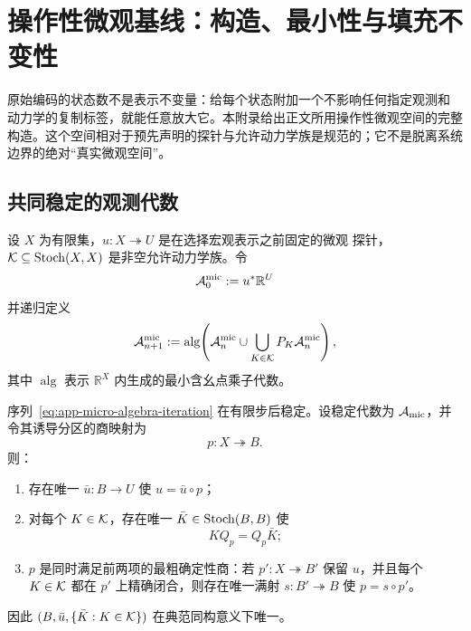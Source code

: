\section{操作性微观基线：构造、最小性与填充不变性}
\label{app:operational-baseline}

原始编码的状态数不是表示不变量：给每个状态附加一个不影响任何指定观测和
动力学的复制标签，就能任意放大它。本附录给出正文所用操作性微观空间的完整
构造。这个空间相对于预先声明的探针与允许动力学族是规范的；它不是脱离系统
边界的绝对``真实微观空间''。

\subsection{共同稳定的观测代数}

设 $X$ 为有限集，$u:X\twoheadrightarrow U$ 是在选择宏观表示之前固定的微观
探针，$\mathcal K\subseteq\operatorname{Stoch}(X,X)$ 是非空允许动力学族。令
\[
  \mathcal A^{\mathrm{mic}}_0:=u^*\mathbb R^U
\]
并递归定义
\begin{equation}
  \mathcal A^{\mathrm{mic}}_{n+1}
  :=\operatorname{alg}\!\left(
      \mathcal A^{\mathrm{mic}}_n
      \cup\bigcup_{K\in\mathcal K}P_K\mathcal A^{\mathrm{mic}}_n
    \right),
  \label{eq:app-micro-algebra-iteration}
\end{equation}
其中 $\operatorname{alg}$ 表示 $\mathbb R^X$ 内生成的最小含幺点乘子代数。

\begin{theorem}[操作性微观商]
\label{thm:app-operational-core}
序列~\eqref{eq:app-micro-algebra-iteration} 在有限步后稳定。设稳定代数为
$\mathcal A_{\mathrm{mic}}$，并令其诱导分区的商映射为
\[
  p:X\twoheadrightarrow B.
\]
则：
\begin{enumerate}
  \item 存在唯一 $\bar u:B\to U$ 使 $u=\bar u\circ p$；
  \item 对每个 $K\in\mathcal K$，存在唯一 $\bar K\in\operatorname{Stoch}(B,B)$ 使
  \begin{equation}
    KQ_p=Q_p\bar K;
    \label{eq:app-operational-intertwining}
  \end{equation}
  \item $p$ 是同时满足前两项的最粗确定性商：若
  $p':X\twoheadrightarrow B'$ 保留 $u$，并且每个 $K\in\mathcal K$ 都在 $p'$
  上精确闭合，则存在唯一满射 $s:B'\twoheadrightarrow B$ 使
  $p=s\circ p'$。
\end{enumerate}
因此 $(B,\bar u,\{\bar K:K\in\mathcal K\})$ 在典范同构意义下唯一。
\end{theorem}


